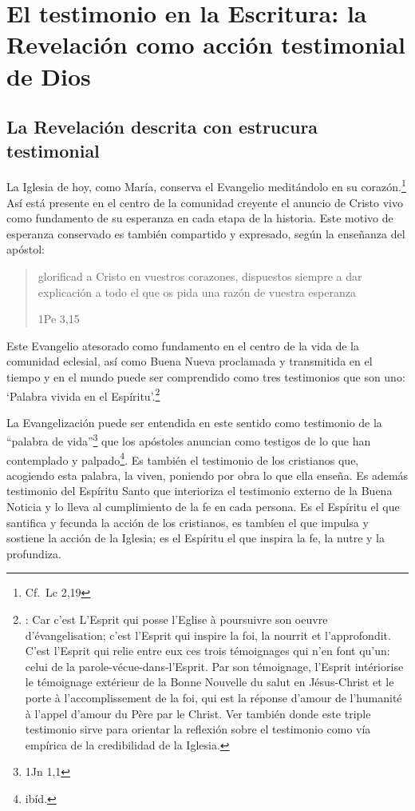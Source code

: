 \section{El testimonio en la Escritura: la Revelación como acción testimonial de Dios}

\subsection{La Revelación descrita con estrucura testimonial}

La Iglesia de hoy, como María, conserva el Evangelio meditándolo en su corazón.\footnote{Cf.~Lc 2,19} Así está presente en el centro de la comunidad creyente el anuncio de Cristo vivo como fundamento de su esperanza en cada etapa de la historia. Este motivo de esperanza conservado es también compartido y expresado, según la enseñanza del apóstol: \blockquote[1Pe 3,15]{glorificad a Cristo en vuestros corazones, dispuestos siempre a dar explicación a todo el que os pida una razón de vuestra esperanza}.

Este Evangelio atesorado como fundamento en el centro de la vida de la comunidad eclesial, así como Buena Nueva proclamada y transmitida en el tiempo y en el mundo puede ser comprendido como tres testimonios que son uno: \enquote*{Palabra vivida en el Espíritu}.\footnote{\cite[Cf.~][110]{latourelle1975et}: Car c'est L'Esprit qui posse l'Eglise à poursuivre son oeuvre d'évangelisation; c'est l'Esprit qui inspire la foi, la nourrit et l'approfondit. C'est l'Esprit qui relie entre eux ces trois témoignages qui n'en font qu'un: celui de la parole-vécue-dans-l'Esprit. Par son témoignage, l'Esprit intériorise le témoignage extérieur de la Bonne Nouvelle du salut en Jésus-Christ et le porte à l'accomplissement de la foi, qui est la réponse d'amour de l'humanité à l'appel d'amour du Père par le Christ. Ver también \cite[582]{ninot2009tf} donde este triple testimonio sirve para orientar la reflexión sobre el testimonio como vía empírica de la credibilidad de la Iglesia.}

La Evangelización puede ser entendida en este sentido como testimonio de la \enquote{palabra de vida}\footnote{1Jn 1,1} que los apóstoles anuncian como testigos de lo que han contemplado y palpado\footnote{ibíd.}. Es también el testimonio de los cristianos que, acogiendo esta palabra, la viven, poniendo por obra lo que ella enseña. Es además testimonio del Espíritu Santo que interioriza el testimonio externo de la Buena Noticia y lo lleva al cumplimiento de la fe en cada persona.\autocite[Cf.~][110]{latourelle1975et} Es el Espíritu el que santifica y fecunda la acción de los cristianos, es tambíen el que impulsa y sostiene la acción de la Iglesia; es el Espíritu el que inspira la fe, la nutre y la profundiza.\autocite[Cf.~][110]{latourelle1975et}

